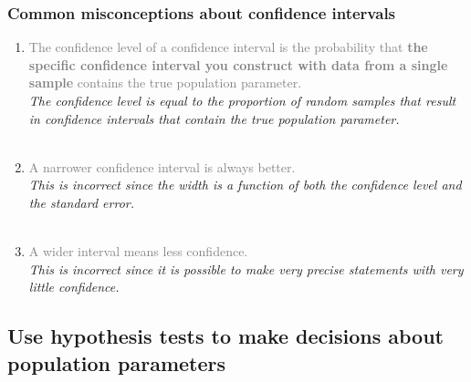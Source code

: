 \documentclass[slidestop,compress,mathserif,12pt,t,professionalfonts,xcolor=table]{beamer}
\begin{document}

\begin{frame}
\frametitle{Common misconceptions about confidence intervals}

\begin{enumerate}

\item \textcolor{gray}{The confidence level of a confidence interval is the probability that \textbf{the specific confidence interval you construct with data from a single sample} contains the true population parameter.} \\
\textit{The confidence level is equal to the proportion of random samples that result in confidence intervals that contain the true population parameter.} \\
$\:$ \\

\pause

\item  \textcolor{gray}{A narrower confidence interval is always better.}\\
\textit{This is incorrect since the width is a function of both the confidence level and the standard error.} \\
$\:$ \\

\pause

\item   \textcolor{gray}{A wider interval means less confidence.} \\
\textit{This is incorrect since it is possible to make very precise statements with very little confidence.} \\

\end{enumerate}

\end{frame}


\subsection{Use hypothesis tests to make decisions about population parameters}
\label{mi7}

\end{document}
